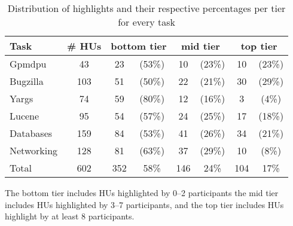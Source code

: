 \begin{table}
\begin{center}
\caption{Distribution of highlights and their respective percentages per tier for every task}
\begin{small}
\begin{threeparttable} 
\begin{tabular}{l|c|cc|cc|cc}
\hline    
\textbf{Task}  
& \textbf{\# HUs} 
& \multicolumn{2}{c|}{\textbf{bottom tier}\tnote{\dag}} 
& \multicolumn{2}{c|}{\textbf{mid tier}\tnote{\dag}} 
& \multicolumn{2}{c}{\textbf{top tier}\tnote{\dag}}\\
\hline    
\hline

Gpmdpu & 43 & 23 & (53\%) & 10 & (23\%) & 10 & (23\%) \\     
Bugzilla & 103 & 51 & (50\%) & 22 & (21\%) & 30 & (29\%) \\
Yargs & 74 & 59 & (80\%) & 12 & (16\%) & 3 & (4\%) \\
Lucene & 95 & 54 & (57\%) & 24 & (25\%) & 17 & (18\%) \\
Databases & 159 & 84 & (53\%) & 41 & (26\%) & 34 & (21\%) \\
Networking & 128 & 81 & (63\%) & 37 & (29\%) & 10 & (8\%) \\
\hline    
\hline 
\rowcolor{white}
Total & 602 & 352 & 58\% & 146 & 24\% & 104 & 17\% \\

\hline 
\end{tabular}
\begin{tablenotes}
    \item[\dag] {\scriptsize The bottom tier includes HUs highlighted by 0--2 participants
    the mid tier includes HUs highlighted by 3--7 participants, and the top tier includes HUs highlight by at least 8 participants.}    
\end{tablenotes}   
\end{threeparttable} 
\end{small}
\label{tbl:task-hu}
\end{center}
\end{table}
    